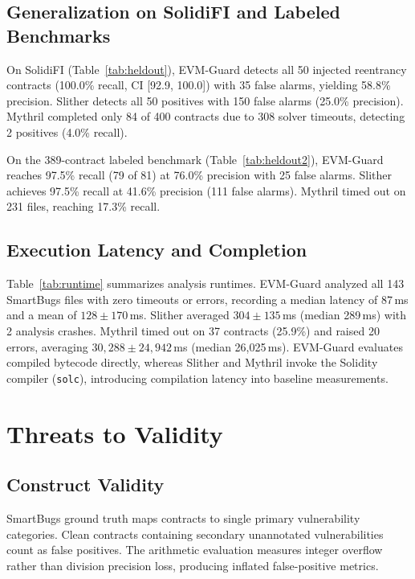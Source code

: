 \documentclass[pdflatex,sn-mathphys]{sn-jnl}
\theoremstyle{thmstyleone}
\theoremstyle{thmstyletwo}
\begin{document}
\subsection{Generalization on SolidiFI and Labeled Benchmarks}\label{sec:results:heldout}

On SolidiFI (Table~\ref{tab:heldout}), EVM-Guard detects all 50 injected reentrancy contracts (100.0\% recall, CI [92.9, 100.0]) with 35 false alarms, yielding 58.8\% precision. Slither detects all 50 positives with 150 false alarms (25.0\% precision). Mythril completed only 84 of 400 contracts due to 308 solver timeouts, detecting 2 positives (4.0\% recall).

On the 389-contract labeled benchmark (Table~\ref{tab:heldout2}), EVM-Guard reaches 97.5\% recall (79 of 81) at 76.0\% precision with 25 false alarms. Slither achieves 97.5\% recall at 41.6\% precision (111 false alarms). Mythril timed out on 231 files, reaching 17.3\% recall.

\subsection{Execution Latency and Completion}\label{sec:results:runtime}

Table~\ref{tab:runtime} summarizes analysis runtimes. EVM-Guard analyzed all 143 SmartBugs files with zero timeouts or errors, recording a median latency of 87\,ms and a mean of $128 \pm 170$\,ms. Slither averaged $304 \pm 135$\,ms (median 289\,ms) with 2 analysis crashes. Mythril timed out on 37 contracts (25.9\%) and raised 20 errors, averaging $30,288 \pm 24,942$\,ms (median 26,025\,ms). EVM-Guard evaluates compiled bytecode directly, whereas Slither and Mythril invoke the Solidity compiler (\texttt{solc}), introducing compilation latency into baseline measurements.

\section{Threats to Validity}\label{sec:threats}

\subsection{Construct Validity}\label{sec:threats:construct}
SmartBugs ground truth maps contracts to single primary vulnerability categories. Clean contracts containing secondary unannotated vulnerabilities count as false positives. The arithmetic evaluation measures integer overflow rather than division precision loss, producing inflated false-positive metrics.
\end{document}
